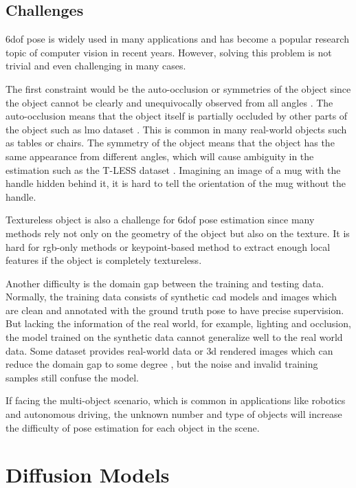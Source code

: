 \documentclass[12pt,DIV14,BCOR12mm,a4paper,footinclude=false,headinclude,parskip=half-,twoside,openright,cleardoublepage=empty,toc=index,bibliography=totoc,listof=totoc]{scrreprt}
\numberwithin{equation}{chapter}
\begin{document}
\subsection{Challenges}
\gls{6dof} pose is widely used in many applications and has become a popular research topic of computer vision in recent years. However, solving this problem is not trivial and even challenging in many cases.

The first constraint would be the auto-occlusion or symmetries of the object since the object cannot be clearly and unequivocally observed from all angles \cite{maru2022}. The auto-occlusion means that the object itself is partially occluded by other parts of the object such as \gls{lmo} dataset  \cite{dataV4MUMX2020}. This is common in many real-world objects such as tables or chairs. The symmetry of the object means that the object has the same appearance from different angles, which will cause ambiguity in the estimation such as the T-LESS dataset \cite{hodan2017tless}. Imagining an image of a mug with the handle hidden behind it, it is hard to tell the orientation of the mug without the handle.

Textureless object is also a challenge for \gls{6dof} pose estimation since many methods rely not only on the geometry of the object but also on the texture. It is hard for \gls{rgb}-only methods \cite{kendall2016posenet} or keypoint-based method \cite{pavlakos20176dof} to extract enough local features if the object is completely textureless.

Another difficulty is the domain gap between the training and testing data. Normally, the training data consists of synthetic \gls{cad} models and images which are clean and annotated with the ground truth pose to have precise supervision. But lacking the information of the real world, for example, lighting and occlusion, the model trained on the synthetic data cannot generalize well to the real world data. Some dataset provides real-world data or \gls{3d} rendered images which can reduce the domain gap to some degree \cite{hodan2019photorealistic}, but the noise and invalid training samples still confuse the model.

If facing the multi-object scenario, which is common in applications like robotics and autonomous driving, the unknown number and type of objects will increase the difficulty of pose estimation for each object in the scene.

\section{Diffusion Models}
\end{document}
